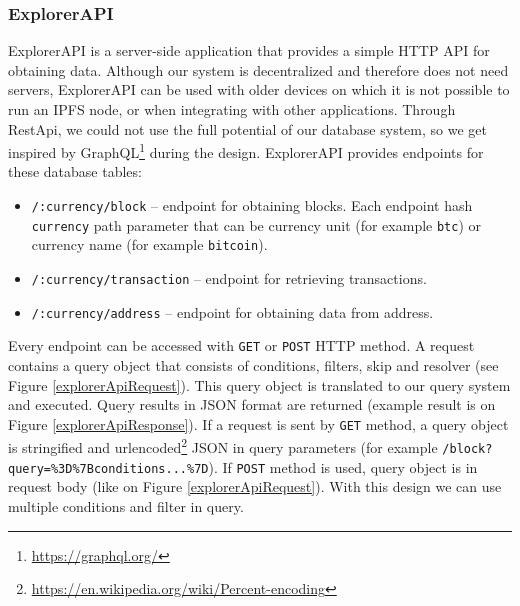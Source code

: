 \subsubsection{ExplorerAPI}
\label{explorerAPIroutes}
ExplorerAPI is a server-side application that provides a simple HTTP API for obtaining data. Although our system is decentralized and therefore does not need servers, ExplorerAPI can be used with older devices on which it is not possible to run an IPFS node, or when integrating with other applications. Through RestApi, we could not use the full potential of our database system, so we get inspired by GraphQL\footnote{\url{https://graphql.org/}} during the design. ExplorerAPI provides endpoints for these database tables:
\begin{itemize}
    \item \texttt{/:currency/block} -- endpoint for obtaining blocks. Each endpoint hash \texttt{currency} path parameter that can be currency unit (for example \texttt{btc}) or currency name (for example \texttt{bitcoin}).
    \item \texttt{/:currency/transaction} -- endpoint for retrieving transactions.  
    \item \texttt{/:currency/address} -- endpoint for obtaining data from address.
\end{itemize}
Every endpoint can be accessed with \texttt{GET} or \texttt{POST} HTTP method. A request contains a query object that consists of conditions, filters, skip and resolver (see Figure \ref{explorerApiRequest}). This query object is translated to our query system and executed. Query results in JSON format are returned (example result is on Figure \ref{explorerApiResponse}). If a request is sent by \texttt{GET} method, a query object is stringified and urlencoded\footnote{\url{https://en.wikipedia.org/wiki/Percent-encoding}} JSON in query parameters (for example \texttt{/block?query=\%3D\%7Bconditions...\%7D}). If \texttt{POST} method is used, query object is in request body (like on Figure \ref{explorerApiRequest}). With this design we can use multiple conditions and filter in query. 





